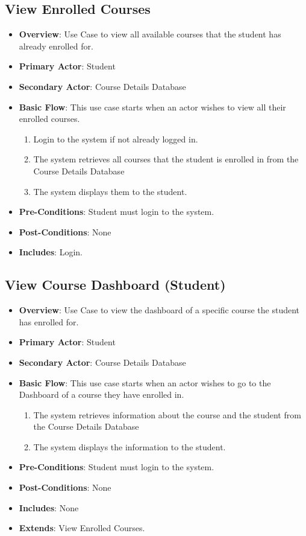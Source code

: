 \documentclass[12pt, a4]{article}
\begin{document}
\subsection{View Enrolled Courses}
\begin{itemize}
    \item \textbf{Overview}: Use Case to view all available courses that the student has already enrolled for.
    \item \textbf{Primary Actor}: Student
    \item \textbf{Secondary Actor}: Course Details Database
    \item \textbf{Basic Flow}: This use case starts when an actor wishes to view all their enrolled courses.
        \begin{enumerate}
            \item Login to the system if not already logged in.
            \item The system retrieves all courses that the student is enrolled in from the Course Details Database
            \item The system displays them to the student.
        \end{enumerate}
    \item \textbf{Pre-Conditions}: Student must login to the system.
    \item \textbf{Post-Conditions}: None
    \item \textbf{Includes}: Login.
\end{itemize}


\subsection{View Course Dashboard (Student)}
\begin{itemize}
    \item \textbf{Overview}: Use Case to view the dashboard of a specific course the student has enrolled for.
    \item \textbf{Primary Actor}: Student
    \item \textbf{Secondary Actor}: Course Details Database
    \item \textbf{Basic Flow}: This use case starts when an actor wishes to go to the Dashboard of a course they have enrolled in.
        \begin{enumerate}
            \item The system retrieves information about the course and the student from the Course Details Database
            \item The system displays the information to the student.
        \end{enumerate}
    \item \textbf{Pre-Conditions}: Student must login to the system.
    \item \textbf{Post-Conditions}: None
    \item \textbf{Includes}: None
    \item \textbf{Extends}: View Enrolled Courses.
\end{itemize}
\end{document}
